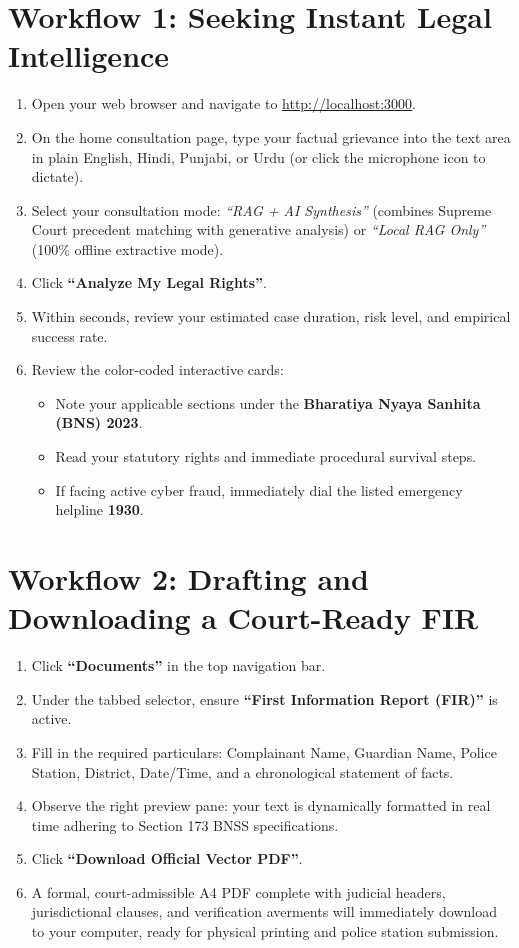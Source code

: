 \section*{Workflow 1: Seeking Instant Legal Intelligence}
\begin{enumerate}
    \item Open your web browser and navigate to \url{http://localhost:3000}.
    \item On the home consultation page, type your factual grievance into the text area in plain English, Hindi, Punjabi, or Urdu (or click the microphone icon to dictate).
    \item Select your consultation mode: \textit{``RAG + AI Synthesis''} (combines Supreme Court precedent matching with generative analysis) or \textit{``Local RAG Only''} (100\% offline extractive mode).
    \item Click \textbf{``Analyze My Legal Rights''}.
    \item Within seconds, review your estimated case duration, risk level, and empirical success rate.
    \item Review the color-coded interactive cards:
    \begin{itemize}
        \item Note your applicable sections under the \textbf{Bharatiya Nyaya Sanhita (BNS) 2023}.
        \item Read your statutory rights and immediate procedural survival steps.
        \item If facing active cyber fraud, immediately dial the listed emergency helpline \textbf{1930}.
    \end{itemize}
\end{enumerate}

\section*{Workflow 2: Drafting and Downloading a Court-Ready FIR}
\begin{enumerate}
    \item Click \textbf{``Documents''} in the top navigation bar.
    \item Under the tabbed selector, ensure \textbf{``First Information Report (FIR)''} is active.
    \item Fill in the required particulars: Complainant Name, Guardian Name, Police Station, District, Date/Time, and a chronological statement of facts.
    \item Observe the right preview pane: your text is dynamically formatted in real time adhering to Section 173 BNSS specifications.
    \item Click \textbf{``Download Official Vector PDF''}.
    \item A formal, court-admissible A4 PDF complete with judicial headers, jurisdictional clauses, and verification averments will immediately download to your computer, ready for physical printing and police station submission.
\end{enumerate}
